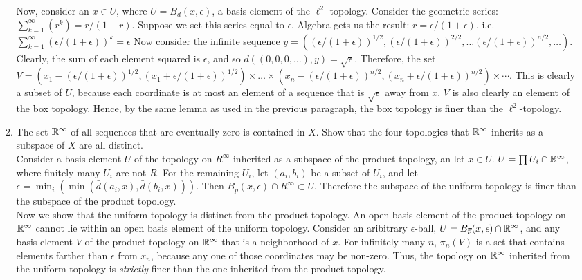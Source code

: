 \documentclass[12pt,letterpaper]{article}
\begin{document}
\begin{enumerate}
\begin{enumerate}
    Now, consider an $x\in U$, where $U=B_d(x,\epsilon)$, a basis element of the $\ell^2$-topology. Consider the geometric series: $\sum_{k=1}^\infty(r^k) = r/(1-r)$. Suppose we set this series equal to $\epsilon$. Algebra gets us the result: $r=\epsilon/(1+\epsilon)$, i.e. $\sum_{k=1}^\infty(\epsilon/(1+\epsilon))^k = \epsilon$ Now consider the infinite sequence $y=((\epsilon/(1+\epsilon))^{1/2}, (\epsilon/(1+\epsilon))^{2/2},\dots (\epsilon/(1+\epsilon))^{n/2},\dots)$. Clearly, the sum of each element squared is $\epsilon$, and so $d((0,0,0,\dots),y)=\sqrt{\epsilon}$. Therefore, the set $V = (x_1-(\epsilon/(1+\epsilon))^{1/2}, (x_1+\epsilon/(1+\epsilon))^{1/2})\times \dots \times(x_n-(\epsilon/(1+\epsilon))^{n/2}, (x_n+\epsilon/(1+\epsilon))^{n/2})\times \cdots$. This is clearly a subset of $U$, because each coordinate is at most an element of a sequence that is $\sqrt{\epsilon}$ away from $x$. $V$ is also clearly an element of the box topology. Hence, by the same lemma as used in the previous paragraph, the box topology is finer than the $\ell^2$-topology.
    \item The set $\mathbb{R}^\infty$ of all sequences that are eventually zero is contained in $X$. Show that the four topologies that $\mathbb{R}^\infty$ inherits as a subspace of $X$ are all distinct. \\
    Consider a basis element $U$ of the topology on $R^\infty$ inherited as a subspace of the product topology, an let $x\in U$. $U=\prod U_i \cap \mathbb{R}^\infty$, where finitely many $U_i$ are not $R$. For the remaining $U_i$, let $(a_i,b_i)$ be a subset of $U_i$, and let $\epsilon = \min_i(\min(\bar{d}(a_i,x), \bar{d}(b_i,x)))$. Then $B_{\bar{p}}(x,\epsilon) \cap R^\infty \subset U$. Therefore the subspace of the uniform topology is finer than the subspace of the product topology. \\
    Now we show that the uniform topology is distinct from the product topology. An open basis element of the product topology on $\mathbb{R}^\infty$ cannot lie within an open basis element of the uniform topology. Consider an aribitrary $\epsilon$-ball, $U=B_{\bar{p}}(x,\epsilon) \cap \R^\infty$, and any basis element $V$ of the product topology on $\mathbb{R}^\infty$ that is a neighborhood of $x$. For infinitely many $n$, $\pi_n(V)$ is a set that contains elements farther than $\epsilon$ from $x_n$, because any one of those coordinates may be non-zero. Thus, the topology on $\mathbb{R}^\infty$ inherited from the uniform topology is \emph{strictly} finer than the one inherited from the product topology. \\

\end{enumerate}
\end{enumerate}
\end{document}
